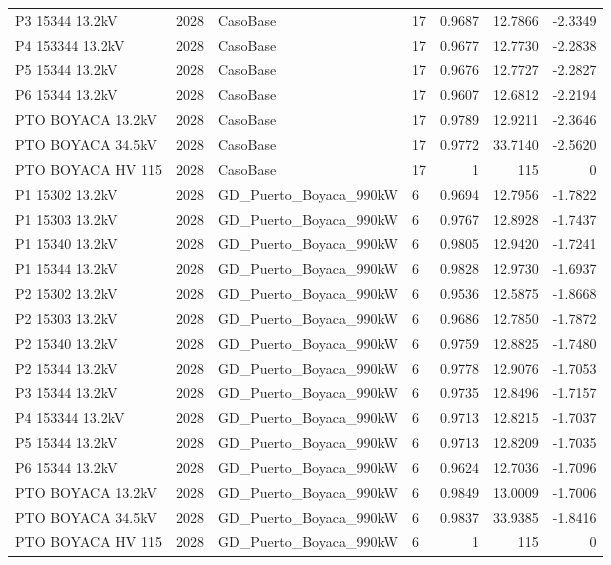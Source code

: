 \documentclass[11pt,a4paper]{article}
\begin{document}
\begin{longtable}{llllrrr}
P3 15344 13.2kV & 2028 & CasoBase & 17 & 0.9687 & 12.7866 & -2.3349 \\
P4 153344 13.2kV & 2028 & CasoBase & 17 & 0.9677 & 12.7730 & -2.2838 \\
P5 15344 13.2kV & 2028 & CasoBase & 17 & 0.9676 & 12.7727 & -2.2827 \\
P6 15344 13.2kV & 2028 & CasoBase & 17 & 0.9607 & 12.6812 & -2.2194 \\
PTO BOYACA 13.2kV & 2028 & CasoBase & 17 & 0.9789 & 12.9211 & -2.3646 \\
PTO BOYACA 34.5kV & 2028 & CasoBase & 17 & 0.9772 & 33.7140 & -2.5620 \\
PTO BOYACA HV 115 & 2028 & CasoBase & 17 & 1 & 115 & 0 \\
P1 15302 13.2kV & 2028 & GD\_Puerto\_Boyaca\_990kW & 6 & 0.9694 & 12.7956 & -1.7822 \\
P1 15303 13.2kV & 2028 & GD\_Puerto\_Boyaca\_990kW & 6 & 0.9767 & 12.8928 & -1.7437 \\
P1 15340 13.2kV & 2028 & GD\_Puerto\_Boyaca\_990kW & 6 & 0.9805 & 12.9420 & -1.7241 \\
P1 15344 13.2kV & 2028 & GD\_Puerto\_Boyaca\_990kW & 6 & 0.9828 & 12.9730 & -1.6937 \\
P2 15302 13.2kV & 2028 & GD\_Puerto\_Boyaca\_990kW & 6 & 0.9536 & 12.5875 & -1.8668 \\
P2 15303 13.2kV & 2028 & GD\_Puerto\_Boyaca\_990kW & 6 & 0.9686 & 12.7850 & -1.7872 \\
P2 15340 13.2kV & 2028 & GD\_Puerto\_Boyaca\_990kW & 6 & 0.9759 & 12.8825 & -1.7480 \\
P2 15344 13.2kV & 2028 & GD\_Puerto\_Boyaca\_990kW & 6 & 0.9778 & 12.9076 & -1.7053 \\
P3 15344 13.2kV & 2028 & GD\_Puerto\_Boyaca\_990kW & 6 & 0.9735 & 12.8496 & -1.7157 \\
P4 153344 13.2kV & 2028 & GD\_Puerto\_Boyaca\_990kW & 6 & 0.9713 & 12.8215 & -1.7037 \\
P5 15344 13.2kV & 2028 & GD\_Puerto\_Boyaca\_990kW & 6 & 0.9713 & 12.8209 & -1.7035 \\
P6 15344 13.2kV & 2028 & GD\_Puerto\_Boyaca\_990kW & 6 & 0.9624 & 12.7036 & -1.7096 \\
PTO BOYACA 13.2kV & 2028 & GD\_Puerto\_Boyaca\_990kW & 6 & 0.9849 & 13.0009 & -1.7006 \\
PTO BOYACA 34.5kV & 2028 & GD\_Puerto\_Boyaca\_990kW & 6 & 0.9837 & 33.9385 & -1.8416 \\
PTO BOYACA HV 115 & 2028 & GD\_Puerto\_Boyaca\_990kW & 6 & 1 & 115 & 0 \\

\end{longtable}
\end{document}
